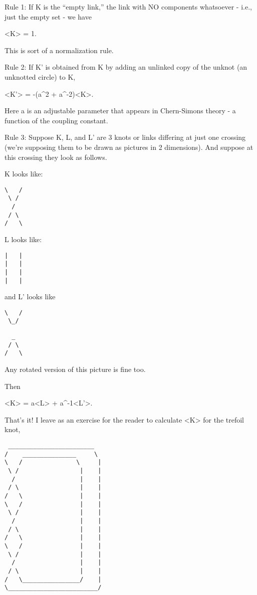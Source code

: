 Rule 1: If K is the ``empty link,'' the link with NO components
whatsoever - i.e., just the empty set - we have 

<K> = 1.   

This is sort of a normalization rule.

Rule 2:  If K' is obtained from K by adding an unlinked copy of the
unknot (an unknotted circle) to K, 

<K'> = -(a^2 + a^{-2})<K>.  

Here a is an adjustable parameter that appears in Chern-Simons theory -
a function of the coupling constant.

Rule 3: Suppose K, L, and L' are 3 knots or links differing at just
one crossing (we're supposing them to be drawn as pictures in 2
dimensions).   And suppose at this crossing they look as follows.

K looks like:

\begin{verbatim}
\   /
 \ /
  /
 / \
/   \
\end{verbatim}
    

L looks like:

\begin{verbatim}
|   |
|   |
|   |
|   |
\end{verbatim}
    

and L' looks like

\begin{verbatim}
\   /
 \_/
\end{verbatim}
    

\begin{verbatim}
  _
 / \
/   \
\end{verbatim}
    

Any rotated version of this picture is fine too.

Then 

<K> = a<L> + a^{-1}<L'>.


That's it!  I leave as an exercise for the reader to calculate
<K> for the trefoil knot,

\begin{verbatim}
 ________________________
/    _______________     \ 
\   /               \     |
 \ /                 |    |
  /                  |    |    
 / \                 |    |
/   \                |    |
\   /                |    |
 \ /                 |    |
  /                  |    |    
 / \                 |    |
/   \                |    |
\   /                |    |
 \ /                 |    |
  /                  |    |    
 / \                 |    |
/   \________________/    |
\_________________________/

\end{verbatim}
    

